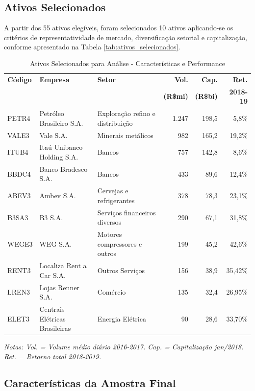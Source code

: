 \subsection{Ativos Selecionados}

A partir dos 55 ativos elegíveis, foram selecionados 10 ativos aplicando-se os critérios de representatividade de mercado, diversificação setorial e capitalização, conforme apresentado na Tabela \ref{tab:ativos_selecionados}.

\begin{table}[H]
\centering
\caption{Ativos Selecionados para Análise - Características e Performance}
\scriptsize
\begin{tabular}{|l|p{3.2cm}|p{2.0cm}|r|r|r|}
\hline
\textbf{Código} & \textbf{Empresa} & \textbf{Setor} & \textbf{Vol.} & \textbf{Cap.} & \textbf{Ret.} \\
& & & \textbf{(R\$mi)} & \textbf{(R\$bi)} & \textbf{2018-19} \\
\hline
PETR4 & Petróleo Brasileiro S.A. & Exploração refino e distribuição & 1.247 & 198,5 & 5,8\% \\
\hline
VALE3 & Vale S.A. & Minerais metálicos & 982 & 165,2 & 19,2\% \\
\hline
ITUB4 & Itaú Unibanco Holding S.A. & Bancos & 757 & 142,8 & 8,6\% \\
\hline
BBDC4 & Banco Bradesco S.A. & Bancos & 433 & 89,6 & 12,4\% \\
\hline
ABEV3 & Ambev S.A. & Cervejas e refrigerantes & 378 & 78,3 & 23,1\% \\
\hline
B3SA3 & B3 S.A. & Serviços financeiros diversos & 290 & 67,1 & 31,8\% \\
\hline
WEGE3 & WEG S.A. & Motores compressores e outros & 199 & 45,2 & 42,6\% \\
\hline
RENT3 & Localiza Rent a Car S.A. & Outros Serviços & 156 & 38,9 & 35,42\% \\
\hline
LREN3 & Lojas Renner S.A. & Comércio & 135 & 32,4 & 26,95\% \\
\hline
ELET3 & Centrais Elétricas Brasileiras & Energia Elétrica & 90 & 28,6 & 33,70\% \\
\hline
\end{tabular}
\normalsize
\textit{Notas: Vol. = Volume médio diário 2016-2017. Cap. = Capitalização jan/2018. Ret. = Retorno total 2018-2019.}
\label{tab:ativos_selecionados_resultados}
\end{table}

\subsection{Características da Amostra Final}


